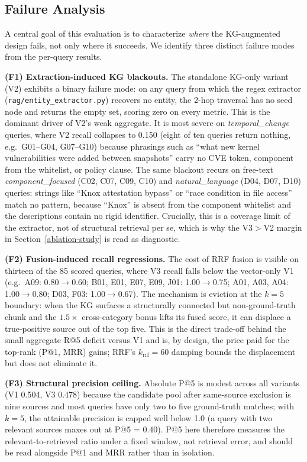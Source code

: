 \documentclass[
]{article}
\begin{document}
\subsection{Failure Analysis}
\label{failure-analysis}

A central goal of this evaluation is to characterize \emph{where} the
KG-augmented design fails, not only where it succeeds. We identify three
distinct failure modes from the per-query results.

\noindent\textbf{(F1) Extraction-induced KG blackouts.} The standalone
KG-only variant (V2) exhibits a binary failure mode: on any query from
which the regex extractor (\texttt{rag/entity\_extractor.py}) recovers no
entity, the 2-hop traversal has no seed node and returns the empty set,
scoring zero on every metric. This is the dominant driver of V2's weak
aggregate. It is most severe on \textit{temporal\_change} queries, where
V2 recall collapses to 0.150 (eight of ten queries return nothing,
e.g.\ G01--G04, G07--G10) because phrasings such as ``what new kernel
vulnerabilities were added between snapshots'' carry no CVE token,
component from the whitelist, or policy clause. The same blackout recurs
on free-text \textit{component\_focused} (C02, C07, C09, C10) and
\textit{natural\_language} (D04, D07, D10) queries: strings like ``Knox
attestation bypass'' or ``race condition in file access'' match no
pattern, because ``Knox'' is absent from the component whitelist and the
descriptions contain no rigid identifier. Crucially, this is a coverage
limit of the extractor, not of structural retrieval per se, which is why
the V3$>$V2 margin in Section~\ref{ablation-study} is read as diagnostic.

\noindent\textbf{(F2) Fusion-induced recall regressions.} The cost of
RRF fusion is visible on thirteen of the 85 scored queries, where V3
recall falls below the vector-only V1 (e.g.\ A09: 0.80$\to$0.60; B01,
E01, E07, E09, J01: 1.00$\to$0.75; A01, A03, A04: 1.00$\to$0.80; D03,
F03: 1.00$\to$0.67). The
mechanism is eviction at the $k=5$ boundary: when the KG surfaces a
structurally connected but non-ground-truth chunk and the
$1.5\times$ cross-category bonus lifts its fused score, it can displace a
true-positive source out of the top five. This is the direct trade-off
behind the small aggregate R@5 deficit versus V1 and is, by design, the
price paid for the top-rank (P@1, MRR) gains; RRF's $k_{\mathrm{rrf}}=60$
damping bounds the displacement but does not eliminate it.

\noindent\textbf{(F3) Structural precision ceiling.} Absolute P@5 is
modest across all variants (V1 0.504, V3 0.478) because the candidate
pool after same-source exclusion is nine sources and most queries have
only two to five ground-truth matches; with $k=5$, the attainable
precision is capped well below 1.0 (a query with two relevant sources
maxes out at P@5 = 0.40). P@5 here therefore measures the
relevant-to-retrieved ratio under a fixed window, not retrieval error,
and should be read alongside P@1 and MRR rather than in isolation.
\end{document}
